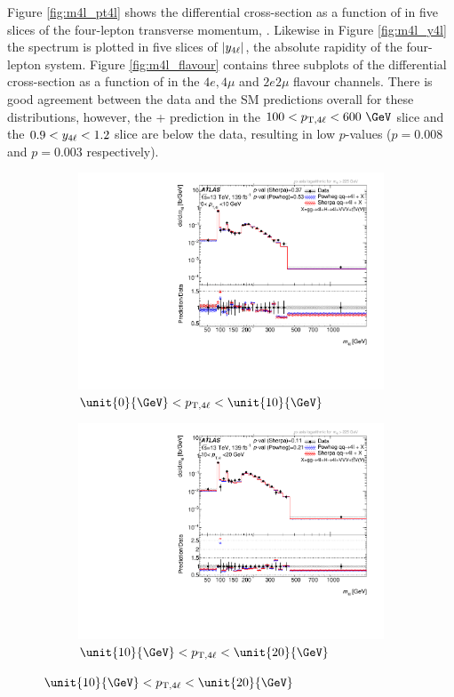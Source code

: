 Figure \ref{fig:m4l_pt4l} shows the differential cross-section as a function of \mFourL{} in five slices of the four-lepton transverse momentum, \ptFourL{}. Likewise in Figure \ref{fig:m4l_y4l} the \mFourL{} spectrum is plotted in five slices of $|y_{4\ell}{}|$, the absolute rapidity of the four-lepton system. Figure \ref{fig:m4l_flavour} contains three subplots of the differential cross-section as a function of \mFourL{} in the $4e, 4\mu$ and $2e2\mu$ flavour channels. There is good agreement between the data and the SM predictions overall for these distributions, however, the \POWHEG{}+\pythia{} prediction in the $100 < \ptFourL{} < 600~\GeV$ slice and the $0.9 < y_{4\ell}{} < 1.2$ slice are below the data, resulting in low $p$-values ($p = 0.008$ and $p = 0.003$ respectively).
\begin{figure}[htb!]
    \begin{subfigure}{.43\textwidth}\centering
      \includegraphics[width=.99\linewidth]{Figures/m4l/UnfoldedResults/linlog_Unfolded_Data_m4l_pt4l0-10.pdf}\caption{$\unit{0}{\GeV} <  \ptFourL  < \unit{10}{\GeV}$}\label{fig:sub-first}
    \end{subfigure}
    \begin{subfigure}{.43\textwidth}\centering
      \includegraphics[width=.99\linewidth]{Figures/m4l/UnfoldedResults/linlog_Unfolded_Data_m4l_pt4l10-20.pdf} \caption{$\unit{10}{\GeV} <  \ptFourL  < \unit{20}{\GeV}$}\label{fig:sub-second}

\end{subfigure}
\end{figure}
